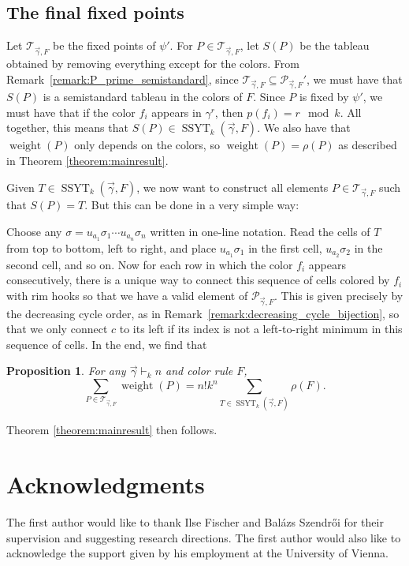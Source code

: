\documentclass[a4paper,12pt]{amsart}
\theoremstyle{plain}
\newtheorem{proposition}[theorem]{Proposition}
\theoremstyle{definition}
\theoremstyle{remark}
\DeclareMathOperator{\SSYT}{SSYT}
\DeclareMathOperator{\weight}{weight}
\begin{document}
\subsection{The final fixed points}
Let $\mathcal{T}_{\vec{\gamma},F}$ be the fixed points of $\psi'$. 
For $P\in \mathcal{T}_{\vec{\gamma},F}$, let $S(P)$ be the tableau obtained by removing everything except for the colors. From Remark~\ref{remark:P_prime_semistandard},
since $\mathcal{T}_{\vec{\gamma},F} \subseteq \mathcal{P}_{\vec{\gamma},F}'$, we must have that $S(P)$ is a semistandard tableau in the colors of $F$. Since $P$ is fixed by $\psi'$, we must have that if the color $f_i$ appears in $\gamma^r$, then $p(f_i) = r \mod k$. All together, this means that 
$S(P) \in \SSYT_k(\vec{\gamma},F).$ We also have that $\weight(P)$ only depends on the colors, so $\weight(P) = \rho(P)$ as described in Theorem \ref{theorem:mainresult}.

Given $T \in \SSYT_k(\vec{\gamma},F)$, we now want to construct all elements $P \in \mathcal{T}_{\vec{\gamma},F}$ such that $S(P) =T$. But this can be done in a very simple way: 

Choose any $\sigma = u_{a_1} \sigma_1 \cdots u_{a_n} \sigma_n$ written in one-line notation. Read the cells of $T$ from top to bottom, left to right, and place $u_{a_1} \sigma_1$ in the first cell, $u_{a_2} \sigma_2$ in the second cell, and so on.
Now for each row in which the color $f_i$ appears consecutively, there is a unique way to connect this sequence of cells colored by $f_i$ with rim hooks so that we have a valid element of $\mathcal{P}_{\vec{\gamma},F}$. This is given precisely by the decreasing cycle order, as in Remark~\ref{remark:decreasing_cycle_bijection}, so that we only connect $c$ to its left if its index is not a left-to-right minimum in this sequence of cells. In the end, we find that
\begin{proposition}
For any $\vec{\gamma} \vdash_k n$ and color rule $F$, 
\[
\sum_{P \in \mathcal{T}_{\vec{\gamma},F}} \weight(P) = n! k^n \sum_{T\in \SSYT_k(\vec{\gamma},F)} \rho(F).
\]
\end{proposition}

Theorem \ref{theorem:mainresult} then follows.

\section{Acknowledgments}
The first author would like to thank Ilse Fischer and Bal\'{a}zs Szendr\H{o}i for their supervision and suggesting research directions. The first author would also like to acknowledge the support given by his employment at the University of Vienna.
\end{document}
